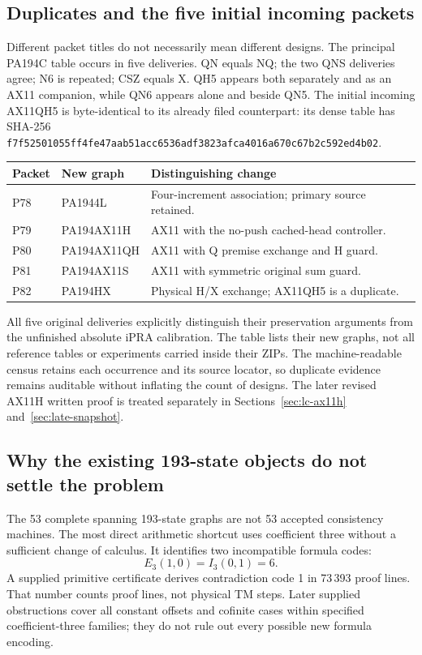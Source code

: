 \subsection{Duplicates and the five initial incoming packets}

Different packet titles do not necessarily mean different designs.
The principal PA194C table occurs in five deliveries. QN equals NQ;
the two QNS deliveries agree; N6 is repeated; CSZ equals X. QH5 appears
both separately and as an AX11 companion, while QN6 appears alone and
beside QN5. The initial incoming AX11QH5 is byte-identical to its
already filed counterpart: its dense table has SHA-256
\nolinkurl{f7f52501055ff4fe47aab51acc6536adf3823afca4016a670c67b2c592ed4b02}.

\begin{center}
\small
\begin{tabularx}{\linewidth}{@{}l l X@{}}
\toprule
Packet & New graph & Distinguishing change\\
\midrule
P78 & PA1944L & Four-increment association; primary source retained.\\
P79 & PA194AX11H & AX11 with the no-push cached-head controller.\\
P80 & PA194AX11QH & AX11 with Q premise exchange and H guard.\\
P81 & PA194AX11S & AX11 with symmetric original sum guard.\\
P82 & PA194HX & Physical H/X exchange; AX11QH5 is a duplicate.\\
\bottomrule
\end{tabularx}
\end{center}

All five original deliveries explicitly distinguish their preservation arguments
from the unfinished absolute iPRA calibration. The table lists their
new graphs, not all reference tables or experiments carried inside their
ZIPs. The machine-readable census retains each occurrence and its
source locator, so duplicate evidence remains auditable without
inflating the count of designs. The later revised AX11H written proof
is treated separately in Sections~\ref{sec:lc-ax11h} and~\ref{sec:late-snapshot}.

\subsection{Why the existing 193-state objects do not settle the problem}

The 53 complete spanning 193-state graphs are not 53 accepted
consistency machines. The most direct arithmetic shortcut uses
coefficient three without a sufficient change of calculus. It identifies
two incompatible formula codes:
\[
 E_3(1,0)=I_3(0,1)=6.
\]
A supplied primitive certificate derives contradiction code 1 in
73\,393 proof lines. That number counts proof lines, not physical TM
steps. Later supplied obstructions cover all constant offsets and
cofinite cases within specified coefficient-three families; they do
not rule out every possible new formula encoding.

